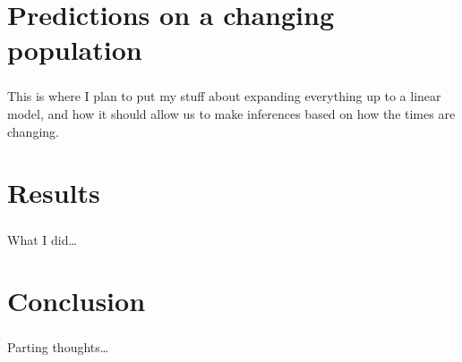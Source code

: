 \documentclass[aspectratio=169]{beamer}
\begin{document}
\section{Predictions on a changing population}

\begin{frame} \frametitle{\insertsection}

    This is where I plan to put my stuff about
    expanding everything up to a linear model,
    and how it should allow us to make inferences
    based on how the times are changing.

\end{frame}

\section{Results}

\begin{frame} \frametitle{\insertsection}

    What I did\ldots

\end{frame}

\section{Conclusion}

\begin{frame} \frametitle{\insertsection}

    Parting thoughts\ldots

\end{frame}
\end{document}
